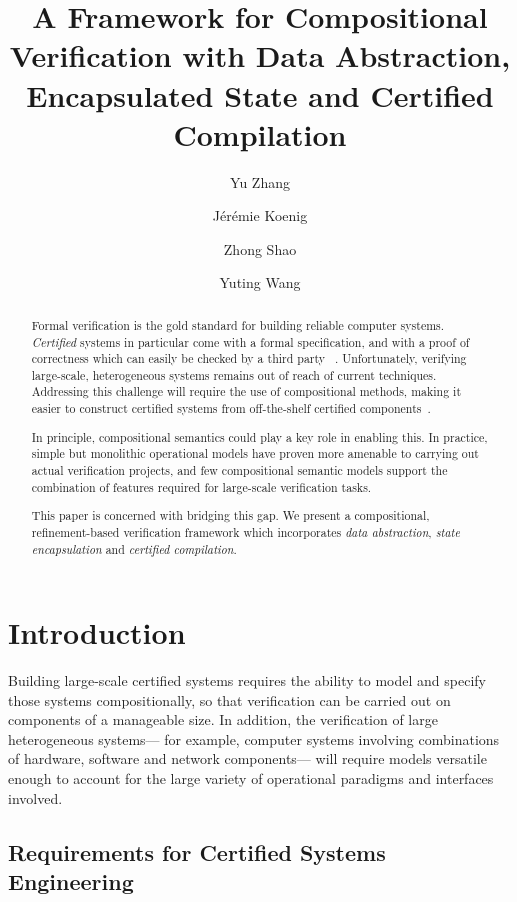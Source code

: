 \documentclass[acmsmall,screen,review,anonymous]{acmart}
\title{A Framework for Compositional Verification with
  Data Abstraction, Encapsulated State and Certified Compilation}
\author{Yu Zhang}
\affiliation{
  \institution{Yale University}
  \city{New Haven}
  \state{CT}
  \country{USA}}
\author{J\'er\'emie Koenig}
\affiliation{
  \institution{Yale University}
  \city{New Haven}
  \state{CT}
  \country{USA}}
\author{Zhong Shao}
\affiliation{
  \institution{Yale University}
  \city{New Haven}
  \state{CT}
  \country{USA}}
\author{Yuting Wang}
\affiliation{
  \institution{Shanghai Jiao Tong University}
  \city{Shanghai}
  \country{China}
}
\begin{document}
\newtheorem{remark}[theorem]{Remark}

\begin{abstract} %
Formal verification is the gold standard
for building reliable computer systems.
\emph{Certified} systems in particular
come with a formal specification,
and with a proof of correctness
which can easily be checked by a third party~%
\cite{shao10}.
Unfortunately, verifying large-scale, heterogeneous systems
remains out of reach of current techniques.
Addressing this challenge
will require the use of compositional methods,
making it easier to construct certified systems
from off-the-shelf certified components~\cite{deepspec}.

In principle,
compositional semantics
could play a key role in enabling this.
In practice, simple but monolithic operational models
have proven more amenable
to carrying out actual verification projects,
and few compositional semantic models
support the combination of features
required for large-scale verification tasks.

This paper is concerned with bridging this gap.
We present a compositional, refinement-based verification framework
which incorporates
\emph{data abstraction},
\emph{state encapsulation} and
\emph{certified compilation}.
\end{abstract}


\maketitle

\section{Introduction} \label{sec:intro} %


Building large-scale certified systems
requires the ability
to model and specify those systems compositionally,
so that verification can be carried out
on components of a manageable size.
In addition,
the verification of large heterogeneous systems---%
for example,
computer systems involving combinations of
hardware, software and network components---%
will require models versatile enough
to account for the large variety of
operational paradigms and interfaces involved.


\subsection{Requirements for Certified Systems Engineering}
\end{document}
